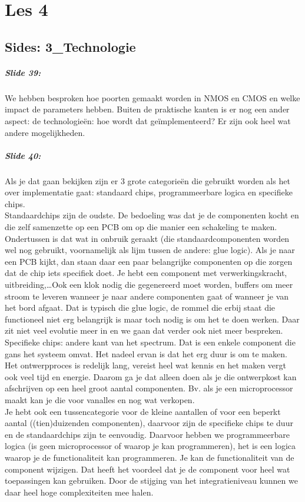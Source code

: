 \documentclass[10pt,a4paper]{book}
\begin{document}
\chapter{Les 4}
\section{Sides: 3\_Technologie}

\paragraph{Slide 39:} We hebben besproken hoe poorten gemaakt worden in NMOS en CMOS en welke impact de parameters hebben. Buiten de praktische kanten is er nog een ander aspect: de technologie\"en: hoe wordt dat ge\"implementeerd? Er zijn ook heel wat andere mogelijkheden.

\paragraph{Slide 40:} Als je dat gaan bekijken zijn er 3 grote categorie\"en die gebruikt worden als het over implementatie gaat: standaard chips, programmeerbare logica en specifieke chips.\\
Standaardchips zijn de oudste. De bedoeling was dat je de componenten kocht en die zelf samenzette op een PCB om op die manier een schakeling te maken. Ondertussen is dat wat in onbruik geraakt (die standaardcomponenten worden wel nog gebruikt, voornamelijk als lijm tussen de andere: glue logic). Als je naar een PCB kijkt, dan staan daar een paar belangrijke componenten op die zorgen dat de chip iets specifiek doet. Je hebt een component met verwerkingskracht, uitbreiding,\ldots Ook een klok nodig die gegenereerd moet worden, buffers om meer stroom te leveren wanneer je naar andere componenten gaat of wanneer je van het bord afgaat. Dat is typisch die glue logic, de rommel die erbij staat die functioneel niet erg belangrijk is maar toch nodig is om het te doen werken. Daar zit niet veel evolutie meer in en we gaan dat verder ook niet meer bespreken.\\
Specifieke chips: andere kant van het spectrum. Dat is een enkele component die gans het systeem omvat. Het nadeel ervan is dat het erg duur is om te maken. Het ontwerpproces is redelijk lang, vereist heel wat kennis en het maken vergt ook veel tijd en energie. Daarom ga je dat alleen doen als je die ontwerpkost kan afschrijven op een heel groot aantal componenten. Bv. als je een microprocessor maakt kan je die voor vanalles en nog wat verkopen. \\
Je hebt ook een tussencategorie voor de kleine aantallen of voor een beperkt aantal ((tien)duizenden componenten), daarvoor zijn de specifieke chips te duur en de standaardchips zijn te eenvoudig. Daarvoor hebben we programmeerbare logica (is geen microprocessor of waarop je kan programmeren), het is een logica waarop je de functionaliteit kan programmeren. Je kan de functionaliteit van de component wijzigen. Dat heeft het voordeel dat je de component voor heel wat toepassingen kan gebruiken. Door de stijging van het integratieniveau kunnen we daar heel hoge complexiteiten mee halen.
\end{document}

